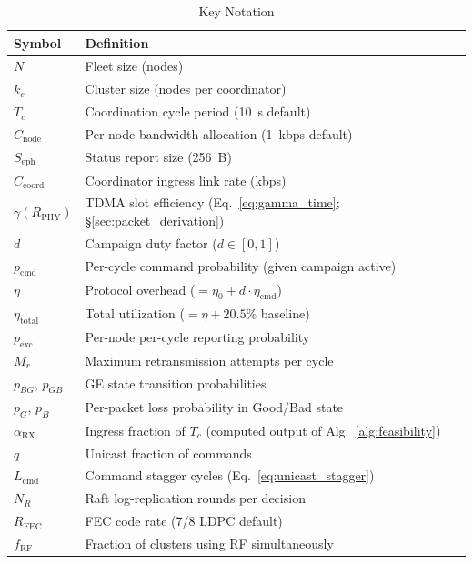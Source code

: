 \documentclass[journal]{IEEEtran}
\begin{document}
\begin{table}[t]
    \centering
    \caption{Key Notation}
    \label{tab:notation}
    \begin{tabular}{@{}ll@{}}
        \toprule
        \textbf{Symbol} & \textbf{Definition} \\
        \midrule
        $N$ & Fleet size (nodes) \\
        $k_c$ & Cluster size (nodes per coordinator) \\
        $T_c$ & Coordination cycle period (10~s default) \\
        $C_{\text{node}}$ & Per-node bandwidth allocation (1~kbps default) \\
        $S_{\text{eph}}$ & Status report size (256~B) \\
        $C_{\text{coord}}$ & Coordinator ingress link rate (kbps) \\
        $\gamma(R_{\text{PHY}})$ & TDMA slot efficiency (Eq.~\ref{eq:gamma_time}; \S\ref{sec:packet_derivation}) \\
        $d$ & Campaign duty factor ($d \in [0,1]$) \\
        $p_{\text{cmd}}$ & Per-cycle command probability (given campaign active) \\
        $\eta$ & Protocol overhead ($= \eta_0 + d \cdot \eta_{\text{cmd}}$) \\
        $\eta_{\text{total}}$ & Total utilization ($= \eta + 20.5\%$ baseline) \\
        $p_{\text{exc}}$ & Per-node per-cycle reporting probability \\
        $M_r$ & Maximum retransmission attempts per cycle \\
        $p_{BG}$, $p_{GB}$ & GE state transition probabilities \\
        $p_G$, $p_B$ & Per-packet loss probability in Good/Bad state \\
        $\alpha_{\text{RX}}$ & Ingress fraction of $T_c$ (computed output of Alg.~\ref{alg:feasibility}) \\
        $q$ & Unicast fraction of commands \\
        $L_{\text{cmd}}$ & Command stagger cycles (Eq.~\ref{eq:unicast_stagger}) \\
        $N_R$ & Raft log-replication rounds per decision \\
        $R_{\text{FEC}}$ & FEC code rate (7/8 LDPC default) \\
        $f_{\text{RF}}$ & Fraction of clusters using RF simultaneously \\
        \bottomrule
    \end{tabular}
\end{table}
\end{document}
